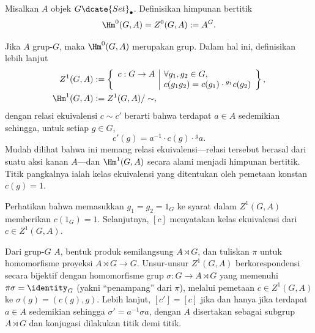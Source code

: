 \begin{definisi}\label{def:nonabelian-H}
	Misalkan $A$ objek $G\dcate{Set}_\bullet$. Definisikan himpunan bertitik
	\[ \Hm^0(G, A) = Z^0(G, A) := A^G. \]
	
	Jika $A$ grup-$G$, maka $\Hm^0(G,A)$ merupakan grup. Dalam hal ini,
	definisikan lebih lanjut
	\begin{align*}
		Z^1(G, A) & := \left\{\begin{array}{r|l}
			c: G \to A & \forall g_1, g_2 \in G, \\
			& c(g_1 g_2) = c(g_1) \cdot {}^{g_1} c(g_2)
		\end{array}\right\}, \\
		\Hm^1(G, A) & := Z^1(G, A) / \sim ,
	\end{align*}
	dengan relasi ekuivalensi $c\sim c'$ berarti bahwa terdapat $a\in A$
	sedemikian sehingga, untuk setiap $g\in G$,
	\[ c'(g) = a^{-1} \cdot c(g) \cdot {}^g a . \]
	Mudah dilihat bahwa ini memang relasi ekuivalensi—relasi tersebut berasal
	dari suatu aksi kanan $A$—dan $\Hm^1(G,A)$ secara alami menjadi himpunan
	bertitik. Titik pangkalnya ialah kelas ekuivalensi yang ditentukan oleh
	pemetaan konstan $c(g)=1$.
\end{definisi}

Perhatikan bahwa memasukkan $g_1=g_2=1_G$ ke syarat dalam $Z^1(G,A)$
memberikan $c(1_G)=1$. Selanjutnya, $[c]$ menyatakan kelas ekuivalensi dari
$c\in Z^1(G,A)$.

\begin{catatan}\label{rem:Z1-vs-section}
	Dari grup-$G$ $A$, bentuk produk semilangsung $A\rtimes G$, dan tuliskan
	$\pi$ untuk homomorfisme proyeksi $A\rtimes G\to G$. Unsur-unsur
	$Z^1(G,A)$ berkorespondensi secara bijektif dengan homomorfisme grup
	$\sigma:G\to A\rtimes G$ yang memenuhi $\pi\sigma=\identity_G$ (yakni
	``penampang'' dari $\pi$), melalui pemetaan
	$c\in Z^1(G,A)$ ke $\sigma(g)=(c(g),g)$. Lebih lanjut, $[c']=[c]$ jika
	dan hanya jika terdapat $a\in A$ sedemikian sehingga
	$\sigma'=a^{-1}\sigma a$, dengan $A$ disertakan sebagai subgrup
	$A\rtimes G$ dan konjugasi dilakukan titik demi titik.
\end{catatan}

